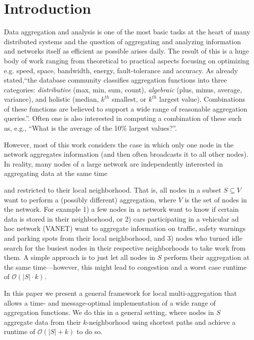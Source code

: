 \documentclass[11pt]{article}
\newcommand{\BO}{\mathcal{O}}
\begin{document}
\section{Introduction}
Data aggregation and analysis is one of the most basic tasks at the heart of many distributed systems and the question of aggregating and analyzing information and networks itself as efficient as possible arises daily. The result of this is a huge body of work ranging from theoretical to practical aspects focusing on optimizing e.g. speed, space, bandwidth, energy, fault-tolerance and accuracy. As already \cite{kuhn2008distributed} stated,``the database community classifies aggregation functions
into three categories: \emph{distributive} (max, min, sum, count), \emph{algebraic} (plus, minus, average, variance), and holistic (median, $k^{th}$ smallest, or $k^{th}$ largest value). Combinations of these functions are believed to support a wide range of reasonable aggregation queries.''. Often one is also interested in computing a combination of these such as, e.g., ``What is the average of the 10\% largest values?''\cite{kuhn2008distributed}.

However, most of this work considers the case in which only one node in the network aggregates information (and then often broadcasts it to all other nodes). In reality, many nodes of a large network are independently interested in aggregating data at the same time 

and restricted to their local neighborhood. That is, all nodes in a subset $S\subseteq V$ want to perform a (possibly different) aggregation, where $V$ is the set of nodes in the network.  For example 1) a few nodes in a network want to know if certain data is stored in their neighborhood, or 2) cars participating in a vehicular ad hoc network (VANET) want to aggregate information on traffic, safety warnings and parking spots from their local neighborhood, and 3) nodes who turned idle search for the busiest nodes in their respective neighborhoods to take work from them. A simple approach is to just let all nodes in $S$ perform their aggregation at the same time---however, this might lead to congestion and a worst case runtime of $\BO(|S|\cdot k)$. 


In this paper we present a general framework for local multi-aggregation that allows a time- and message-optimal implementation of a wide range of aggregation functions. We do this in a general setting, where nodes in $S$ aggregate data from their $k$-neighborhood using shortest paths and achieve a runtime of $\BO(|S|+k)$ to do so. 
\end{document}
